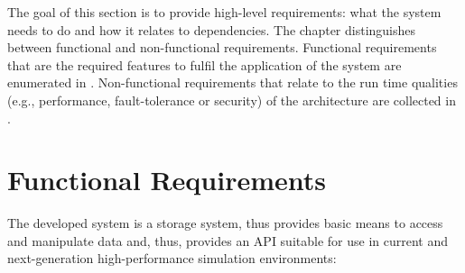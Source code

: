 \begin{chapterIntro}
The goal of this section is to provide high-level requirements: what the system needs to do and how it relates to dependencies. The chapter distinguishes between functional and non-functional requirements.
Functional requirements that are the required features to fulfil the application of the system are enumerated in .
Non-functional requirements that relate to the run time qualities (e.g., performance, fault-tolerance or security) of the architecture are collected in .
\end{chapterIntro}

\label{chap:requirements}


\section{Functional Requirements}
\label{sec: requirements/functional}

The developed system is a storage system, thus provides basic means to access and manipulate data
and, thus, provides an API suitable for use in current and next-generation high-performance simulation environments:

